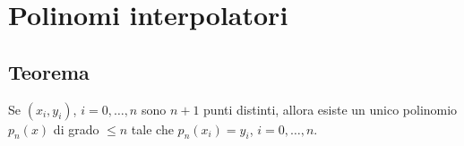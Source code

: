 \chapter{Polinomi interpolatori}

\section{Teorema}
Se $(x_i, y_i)$, $i=0, \ldots, n$ sono $n+1$ punti distinti, allora esiste un unico polinomio $p_n(x)$ di grado $\leq n$ tale che $p_n(x_i)=y_i$, $i=0, \ldots, n$.



